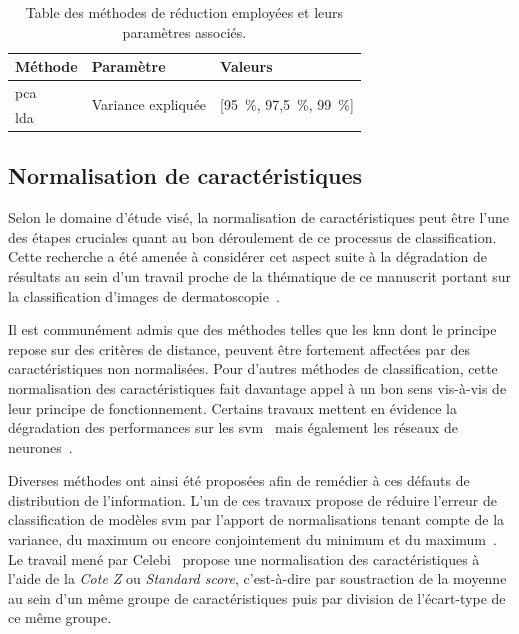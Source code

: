\begin{table}[H]
    \centering
    \begin{tabular}{lll}
        \toprule
        \textbf{Méthode}       & \textbf{Paramètre}                 & \textbf{Valeurs}                      \\ \midrule
        \gls{pca}              & \multirow{2}{*}{Variance expliquée}& \multirow{2}{*}{[95~\%, 97,5~\%, 99~\%]} \\ \cline{1-1}
        \gls{lda}              &                                    &                                       \\ 
        \bottomrule
    \end{tabular}
    \caption{Table des méthodes de réduction employées et leurs paramètres associés.}
    \label{tab:summary_reduction_methods}
\end{table}\par

\subsection{Normalisation de caractéristiques}
\label{subsec:features_normalisation}
Selon le domaine d'étude visé, la normalisation de caractéristiques peut être l'une des étapes cruciales quant au bon déroulement de ce processus de classification. Cette recherche a été amenée à considérer cet aspect suite à la dégradation de résultats au sein d'un travail proche de la thématique de ce manuscrit portant sur la classification d'images de dermatoscopie~\cite{Celebi2007}.\par

Il est communément admis que des méthodes telles que les \gls{knn} dont le principe repose sur des critères de distance, peuvent être fortement affectées par des caractéristiques non normalisées. Pour d'autres méthodes de classification, cette normalisation des caractéristiques fait davantage appel à un bon sens vis-à-vis de leur principe de fonctionnement. Certains travaux mettent en évidence la dégradation des performances sur les \gls{svm}~\cite{Juszczak2002} mais également les réseaux de neurones~\cite{Celebi2007}.\par

Diverses méthodes ont ainsi été proposées afin de remédier à ces défauts de distribution de l'information. L'un de ces travaux propose de réduire l'erreur de classification de modèles \gls{svm} par l'apport de normalisations tenant compte de la variance, du maximum ou encore conjointement du minimum et du maximum~\cite{Juszczak2002}. Le travail mené par Celebi~ propose une normalisation des caractéristiques à l'aide de la \textit{Cote Z} ou \textit{Standard score}, c’est-à-dire par soustraction de la moyenne au sein d'un même groupe de caractéristiques puis par division de l'écart-type de ce même groupe.\par

